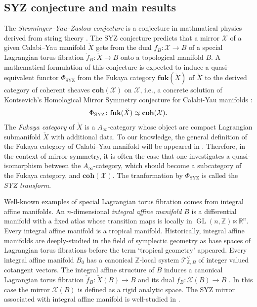 \documentclass[a4paper,dvipdfmx,reqno,12pt]{amsart}
\theoremstyle{definition}
\newcommand{\opn}[1]{\operatorname{#1}}
\newcommand{\catn}[1]{\mathbf{#1}}
\newcommand{\simto}{ 
\mathrel{\raisebox{0.13em}{${\sim}$}}
\kern -0.75em \mathrel{\raisebox{-0.11em}{${\scriptstyle \to}$}}  
}
\numberwithin{equation}{section}
\begin{document}

\subsection{SYZ conjecture and main results}

The \emph{Strominger--Yau--Zaslow conjecture} is
a conjecture in mathmatical physics 
derived from string theory \cite{stromingerMirrorSymmetryTduality1996}. 
The SYZ conjecture 
predicts that a mirror $\mathcal{X}$ of 
a given Calabi--Yau manifold
$\check{X}$ gets from the dual 
$f_B\colon \mathcal{X} \to B$
of a special Lagrangian torus fibration 
$\check{f}_{B}\colon \check{X} \to B$ onto 
a topological manifold $B$.
A mathematical formulation of this conjecture is 
expected to induce a quasi-equivalent
functor $\Phi_{\mathrm{SYZ}}$ 
from the Fukaya category 
$\catn{fuk}(\check{X})$ of $\check{X}$ 
to the derived category of coherent sheaves 
$\catn{coh}(\mathcal{X})$ on $\mathcal{X}$, i.e.,
a concrete solution of 
Kontsevich's Homological 
Mirror Symmetry conjecture for Calabi-Yau manifolds
\cite{MR1403918}:
\begin{align} \label{equation-SYZ}
  \Phi_{\mathrm{SYZ}} \colon 
\catn{fuk}(\check{X})\simto \catn{coh}(\mathcal{X}).
\end{align}
The \emph{Fukaya category} of $\check{X}$ 
is a $A_{\infty}$-category
whose object are compact Lagrangian submanifold
$\check{X}$ with additional data. 
To our knowledge, the general definition 
of the Fukaya category of Calabi--Yau manifold
will be appeared in \cite{afooo}.
Therefore, in the context of mirror symmetry, 
it is often the case that one investigates 
a quasi-isomorphism between the $A_{\infty}$-category, 
which should become a subcategory of the Fukaya category, 
and $\catn{coh}(\mathcal{X})$.
The tranformation by $\Phi_{\mathrm{SYZ}}$ is called 
the \emph{SYZ transform}. 


Well-known examples of special Lagrangian torus 
fibration comes from integral affine manifolds.
An $n$-dimensional 
\emph{integral affine manifold} $B$ 
is a differential manifold 
with a fixed atlas whose transition maps is locally in 
$\opn{GL}(n,\mathbb{Z})\ltimes \mathbb{R}^{n}$.
Every integral affine manifold is a tropical manifold.
Historically, integral affine manifolds are 
deeply-studied in the field of symplectic geometry 
as base spaces of Lagrangian torus fibrations 
\cite{duistermaatGlobalActionangleCoordinates1980a} before
the term `tropical geometry' appeared.
Every integral affine manifold $B_0$ has 
a canonical $\mathbb{Z}$-local system 
$\mathcal{T}^{\vee}_{\mathbb{Z},B}$ of integer
valued cotangent vectors. The integral affine 
structure of $B$ induces a canonical 
Lagrangian torus fibration 
$\check{f}_{B}\colon \check{X}(B)
\to B$ and its dual 
$f_{B}\colon \mathcal{X}(B)\to B$
\cite{MR1882331}. In this case 
the mirror $\mathcal{X}(B)$ is defined as a 
rigid analytic space.
The SYZ mirror associated with 
integral affine manifold is well-studied in 
\cite{MR1882331,MR3728639,MR3656481,MR4301560}.
\end{document}
